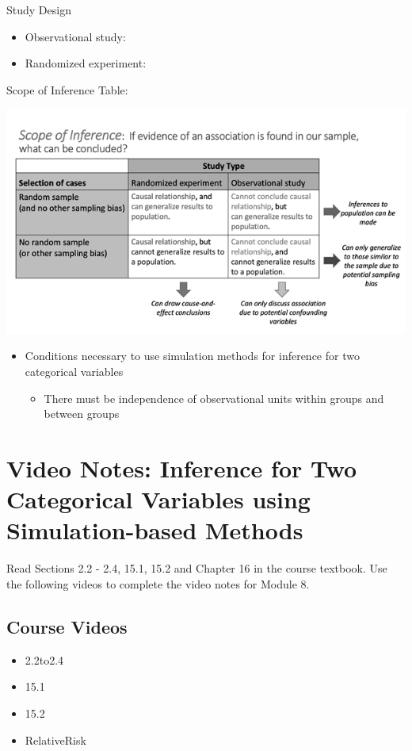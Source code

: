 \documentclass[
]{report}
\providecommand{\tightlist}{%
  \setlength{\itemsep}{0pt}\setlength{\parskip}{0pt}}
\begin{document}
Study Design

\begin{itemize}
\item
  Observational study:
\item
  Randomized experiment:
\end{itemize}

Scope of Inference Table:

\begin{center}\includegraphics[width=0.65\linewidth]{images/ScopeOfInferenceGreyscale} \end{center}

\begin{itemize}
\item
  Conditions necessary to use simulation methods for inference for two categorical variables

  \begin{itemize}
  \tightlist
  \item
    There must be independence of observational units within groups and between groups
  \end{itemize}
\end{itemize}

\newpage

\section{Video Notes: Inference for Two Categorical Variables using Simulation-based Methods}\label{video-notes-inference-for-two-categorical-variables-using-simulation-based-methods}

Read Sections 2.2 - 2.4, 15.1, 15.2 and Chapter 16 in the course textbook. Use the following videos to complete the video notes for Module 8.

\subsection{Course Videos}\label{course-videos-6}

\begin{itemize}
\item
  2.2to2.4
\item
  15.1
\item
  15.2
\item
  RelativeRisk
\end{itemize}
\end{document}
